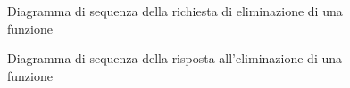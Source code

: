 \begin{figure}[H]
	\noindent
	\caption{Diagramma di sequenza della richiesta di eliminazione di una funzione}
\end{figure}
\begin{figure}[H]
	\noindent
	\caption{Diagramma di sequenza della risposta all'eliminazione di una funzione}
\end{figure}

